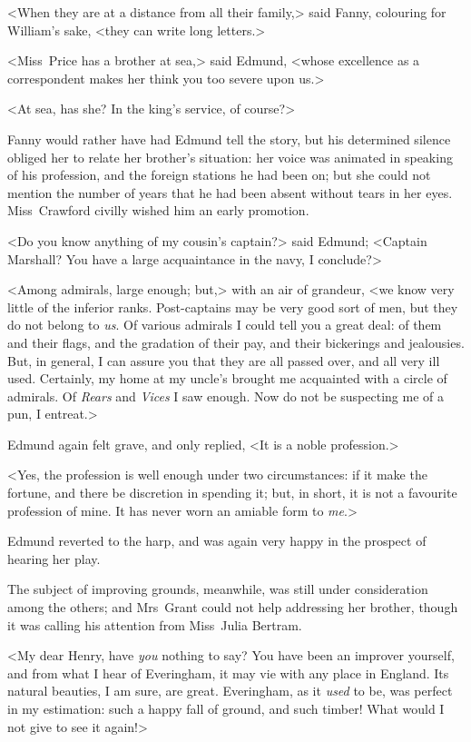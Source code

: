 <When they are at a distance from all their family,> said Fanny, colouring for William's sake, <they can write long letters.>

<Miss~Price has a brother at sea,> said Edmund, <whose excellence as a correspondent makes her think you too severe upon us.>

<At sea, has she? In the king's service, of course?>

Fanny would rather have had Edmund tell the story, but his determined silence obliged her to relate her brother's situation: her voice was animated in speaking of his profession, and the foreign stations he had been on; but she could not mention the number of years that he had been absent without tears in her eyes. Miss~Crawford civilly wished him an early promotion.

<Do you know anything of my cousin's captain?> said Edmund; <Captain Marshall? You have a large acquaintance in the navy, I conclude?>

<Among admirals, large enough; but,> with an air of grandeur, <we know very little of the inferior ranks. Post-captains may be very good sort of men, but they do not belong to \textit{us}. Of various admirals I could tell you a great deal: of them and their flags, and the gradation of their pay, and their bickerings and jealousies. But, in general, I can assure you that they are all passed over, and all very ill used. Certainly, my home at my uncle's brought me acquainted with a circle of admirals. Of \textit{Rears}  and \textit{Vices}  I saw enough. Now do not be suspecting me of a pun, I entreat.>

Edmund again felt grave, and only replied, <It is a noble profession.>

<Yes, the profession is well enough under two circumstances: if it make the fortune, and there be discretion in spending it; but, in short, it is not a favourite profession of mine. It has never worn an amiable form to \textit{me}.>

Edmund reverted to the harp, and was again very happy in the prospect of hearing her play.

The subject of improving grounds, meanwhile, was still under consideration among the others; and Mrs~Grant could not help addressing her brother, though it was calling his attention from Miss~Julia Bertram.

<My dear Henry, have \textit{you}  nothing to say? You have been an improver yourself, and from what I hear of Everingham, it may vie with any place in England. Its natural beauties, I am sure, are great. Everingham, as it \textit{used}  to be, was perfect in my estimation: such a happy fall of ground, and such timber! What would I not give to see it again!>

